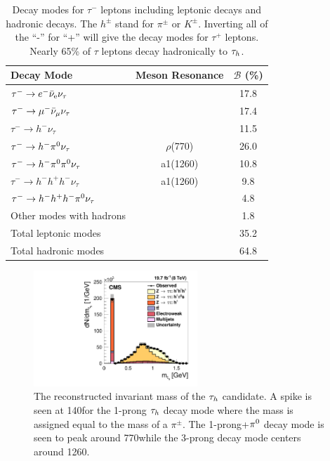 \begin{table}[htbp]
\centering
\begin{tabular}{lcc}
Decay Mode                                             &   Meson Resonance     & $\mathcal{B}$ (\%) \\
\hline
$\tau^{-}  \to  e^{-}\bar{\nu}_{\text{e}}\nu_{\tau}$ &                        &     17.8  \\
$\tau^{-}  \to  \mu^{-}\bar{\nu}_{\mu}\nu_{\tau}$     &                        &     17.4  \\
$\tau^{-}  \to  h^{-}\nu_{\tau}$                       &                        &     11.5  \\
$\tau^{-}  \to  h^{-}\pi^{0}\nu_{\tau}$                  &      $\rho$(770)       &     26.0  \\
$\tau^{-}  \to  h^{-}\pi^{0}\pi^{0}\nu_{\tau}$             &      a1(1260)          &     10.8  \\
$\tau^{-}  \to  h^{-}h^{+}h^{-}\nu_{\tau}$             &      a1(1260)          &      9.8  \\
$\tau^{-}  \to  h^{-}h^{+}h^{-}\pi^{0}\nu_{\tau}$        &                        &      4.8  \\
Other modes with hadrons                               &                        &      1.8  \\
\hline
Total leptonic modes                                   &                        &     35.2  \\
Total hadronic modes                                   &                        &     64.8  \\
\hline
\end{tabular}
\caption{
Decay modes for $\tau^{-}$ leptons including leptonic decays and hadronic decays. 
The $h^{\pm}$ stand for $\pi^{\pm}$ or $K^{\pm}$. Inverting all
of the ``-'' for ``+'' will give the decay modes for $\tau^{+}$ leptons. Nearly 65\% of $\tau$
leptons decay hadronically to $\tau_{h}$.
}
\label{tab:tau_dms}
\end{table}

\begin{figure}[htbp]
\centering
     \includegraphics[width=0.55\textwidth]{object_reconstruction_and_selection/plots/CMS-TAU-14-001_tau_mass.pdf}
     \caption{
The reconstructed invariant mass of the $\tau_{h}$ candidate. A spike is seen at 140\MeV for the 1-prong
$\tau_{h}$ decay mode where the mass is assigned equal to the mass of a $\pi^{\pm}$. The 1-prong+$\pi^{0}$
decay mode is seen to peak around 770\MeV while the 3-prong decay mode centers around 1260\MeV.
     }
     \label{fig:tau_mass}
\end{figure}

